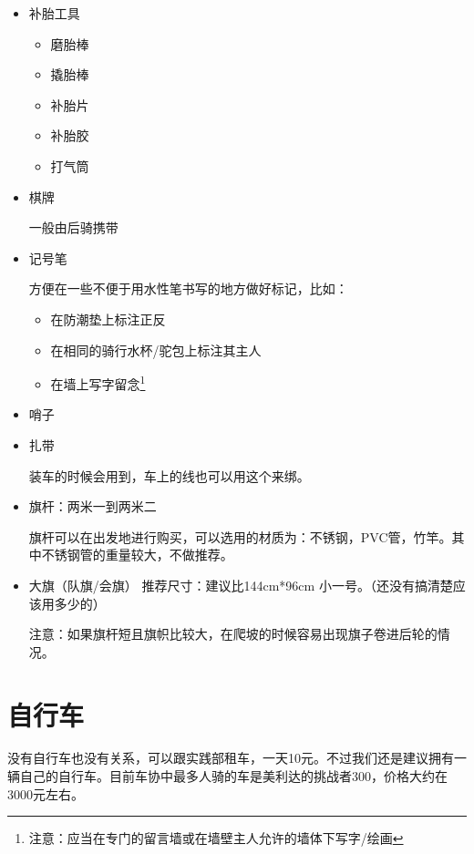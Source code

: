 \documentclass{ctexbook}
\begin{document}
\begin{itemize}
        \item 补胎工具
        \begin{itemize}
            \item 磨胎棒
            \item 撬胎棒
            \item 补胎片
            \item 补胎胶
            \item 打气筒
        \end{itemize}
        \item 棋牌    
    
        一般由后骑携带
        \item 记号笔
        
        方便在一些不便于用水性笔书写的地方做好标记，比如：
        \begin{itemize}
            \item 在防潮垫上标注正反
            \item 在相同的骑行水杯/驼包上标注其主人
            \item 在墙上写字留念\footnote{注意：应当在专门的留言墙或在墙壁主人允许的墙体下写字/绘画}
        \end{itemize}

        \item 哨子
        
        \item 扎带

        装车的时候会用到，车上的线也可以用这个来绑。

        \item 旗杆：两米一到两米二
        
        旗杆可以在出发地进行购买，可以选用的材质为：不锈钢，PVC管，竹竿。其中不锈钢管的重量较大，不做推荐。
        
        \item 大旗（队旗/会旗） 推荐尺寸：建议比144cm*96cm 小一号。（还没有搞清楚应该用多少的）
        
        注意：如果旗杆短且旗帜比较大，在爬坡的时候容易出现旗子卷进后轮的情况。
    \end{itemize}

    \section{自行车} 
    
    没有自行车也没有关系，可以跟实践部租车，一天10元。不过我们还是建议拥有一辆自己的自行车。目前车协中最多人骑的车是美利达的挑战者300，价格大约在3000元左右。
\end{document}
